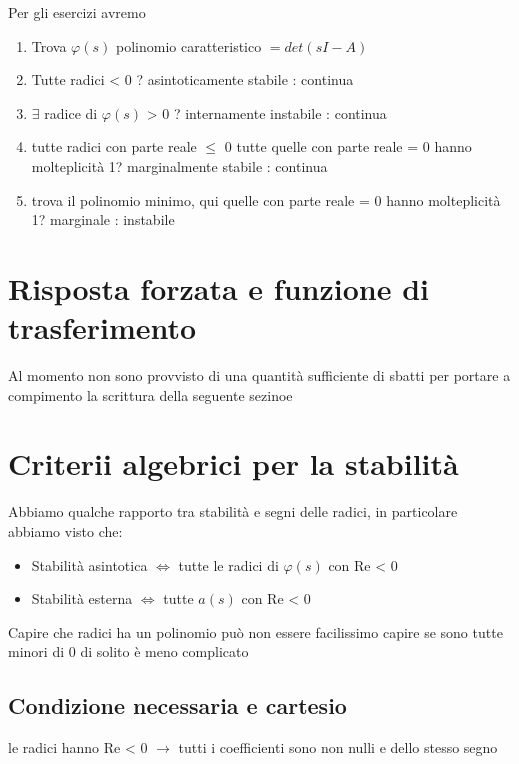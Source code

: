 \documentclass[11pt]{article}
\begin{document}
Per gli esercizi avremo
\begin{enumerate}
\item Trova \(\varphi (s)\) polinomio caratteristico \(= det(sI - A)\)
\item Tutte radici < 0 ? asintoticamente stabile : continua
\item \(\exists\) radice di \(\varphi (s)\) > 0 ? internamente instabile : continua
\item tutte radici con parte reale \(\le\) 0
tutte quelle con parte reale = 0 hanno molteplicità 1? marginalmente
stabile : continua
\item trova il polinomio minimo, qui quelle con parte reale = 0 hanno
molteplicità 1? marginale : instabile
\end{enumerate}

\section{Risposta forzata e funzione di trasferimento}
\label{sec:orgc58d54b}

Al momento non sono provvisto di una quantità sufficiente di sbatti
per portare a compimento la scrittura della seguente sezinoe

\section{Criterii algebrici per la stabilità}
\label{sec:org3546042}

Abbiamo qualche rapporto tra stabilità e segni delle radici, in particolare
abbiamo visto che:

\begin{itemize}
\item Stabilità asintotica $\iff$ tutte le radici di \(\varphi (s)\) con Re < 0
\item Stabilità esterna $\iff$ tutte \(a(s)\) con Re < 0
\end{itemize}

Capire che radici ha un polinomio può non essere facilissimo
capire se sono tutte minori di 0 di solito è meno complicato

\subsection{Condizione necessaria e cartesio}
\label{sec:org49dcdea}

le radici hanno Re < 0 \(\to\) tutti i coefficienti sono non nulli e dello stesso
segno
\end{document}
